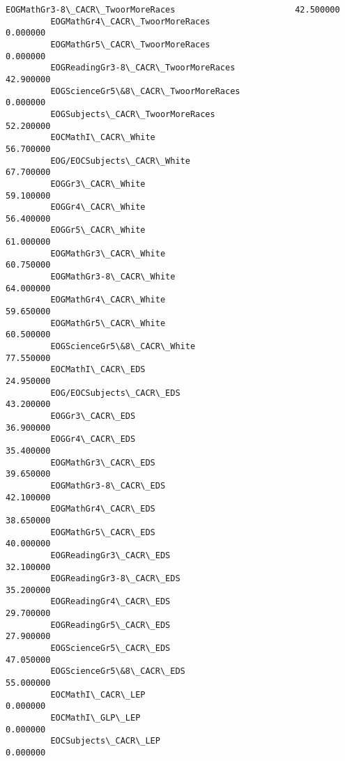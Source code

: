 \documentclass[11pt]{article}
\begin{document}
\begin{Verbatim}[commandchars=\\\{\}]
         EOGMathGr3-8\_CACR\_TwoorMoreRaces                        42.500000   
         EOGMathGr4\_CACR\_TwoorMoreRaces                           0.000000   
         EOGMathGr5\_CACR\_TwoorMoreRaces                           0.000000   
         EOGReadingGr3-8\_CACR\_TwoorMoreRaces                     42.900000   
         EOGScienceGr5\&8\_CACR\_TwoorMoreRaces                      0.000000   
         EOGSubjects\_CACR\_TwoorMoreRaces                         52.200000   
         EOCMathI\_CACR\_White                                     56.700000   
         EOG/EOCSubjects\_CACR\_White                              67.700000   
         EOGGr3\_CACR\_White                                       59.100000   
         EOGGr4\_CACR\_White                                       56.400000   
         EOGGr5\_CACR\_White                                       61.000000   
         EOGMathGr3\_CACR\_White                                   60.750000   
         EOGMathGr3-8\_CACR\_White                                 64.000000   
         EOGMathGr4\_CACR\_White                                   59.650000   
         EOGMathGr5\_CACR\_White                                   60.500000   
         EOGScienceGr5\&8\_CACR\_White                              77.550000   
         EOCMathI\_CACR\_EDS                                       24.950000   
         EOG/EOCSubjects\_CACR\_EDS                                43.200000   
         EOGGr3\_CACR\_EDS                                         36.900000   
         EOGGr4\_CACR\_EDS                                         35.400000   
         EOGMathGr3\_CACR\_EDS                                     39.650000   
         EOGMathGr3-8\_CACR\_EDS                                   42.100000   
         EOGMathGr4\_CACR\_EDS                                     38.650000   
         EOGMathGr5\_CACR\_EDS                                     40.000000   
         EOGReadingGr3\_CACR\_EDS                                  32.100000   
         EOGReadingGr3-8\_CACR\_EDS                                35.200000   
         EOGReadingGr4\_CACR\_EDS                                  29.700000   
         EOGReadingGr5\_CACR\_EDS                                  27.900000   
         EOGScienceGr5\_CACR\_EDS                                  47.050000   
         EOGScienceGr5\&8\_CACR\_EDS                                55.000000   
         EOCMathI\_CACR\_LEP                                        0.000000   
         EOCMathI\_GLP\_LEP                                         0.000000   
         EOCSubjects\_CACR\_LEP                                     0.000000   

\end{Verbatim}
\end{document}
